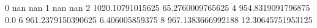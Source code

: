 0 nan nan
1 nan nan
2 1020.10791015625 65.2760009765625
4 954.8319091796875 0.0
6 961.2379150390625 6.406005859375
8 967.1383666992188 12.30645751953125
